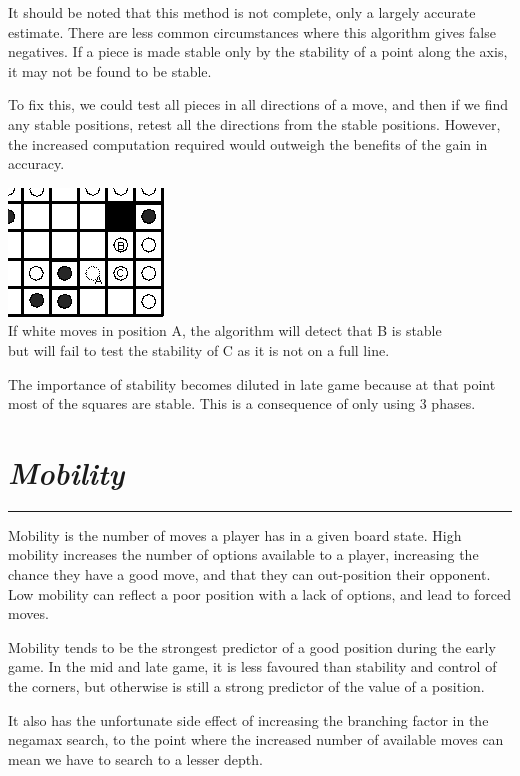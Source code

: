 \documentclass[10pt]{report}
\begin{document}
\begin{multicols}{2}
It should be noted that this method is not complete, only a largely accurate estimate. There are less common circumstances where this algorithm gives false negatives. If a piece is made stable only by the stability of a point along the axis, it may not be found to be stable.

To fix this, we could test all pieces in all directions of a move, and then if we find any stable positions, retest all the directions from the stable positions. However, the increased computation required would outweigh the benefits of the gain in accuracy.

\begin{center}
\includegraphics[scale=0.6]{falsepos.PNG}\\
If white moves in position A, the algorithm will detect that B is stable\\ but will fail to test the stability of C as it is not on a full line.
\end{center}


The importance of stability becomes diluted in late game because at that point most of the squares are stable. This is a consequence of only using 3 phases.
\section*{\emph{\textmd{Mobility}}}
\hrule

Mobility is the number of moves a player has in a given board state. High mobility increases the number of options available to a player, increasing the chance they have a good move, and that they can out-position their opponent. Low mobility can reflect a poor position with a lack of options, and lead to forced moves.

Mobility tends to be the strongest predictor of a good position during the early game. In the mid and late game, it is less favoured than stability and control of the corners, but otherwise is still a strong predictor of the value of a position.

It also has the unfortunate side effect of increasing the branching factor in the negamax search, to the point where the increased number of available moves can mean we have to search to a lesser depth.

\end{multicols}
\end{document}

